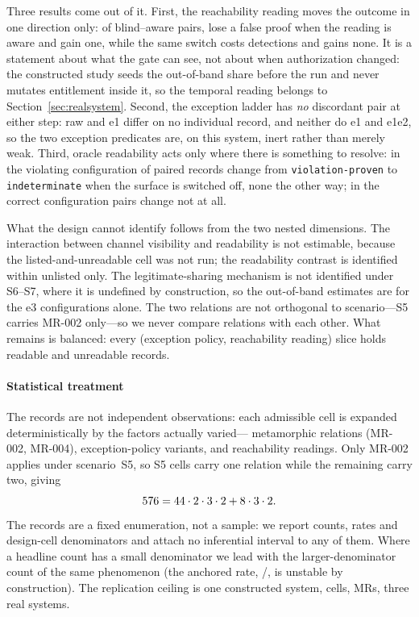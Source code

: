 Three results come out of it. First, the reachability reading moves the outcome in
one direction only: of \DsgGuiPairs{} blind--aware pairs, \DsgGuiFixedFP{} lose a
false proof when the reading is aware and \DsgGuiNewFP{} gain one, while the same
switch costs \DsgGuiLostTP{} detections and gains none. It is a statement about what
the gate can see, not about when authorization changed: the constructed study seeds
the out-of-band share before the run and never mutates entitlement inside it, so the
temporal reading belongs to Section~\ref{sec:realsystem}. Second, the exception
ladder has \emph{no} discordant pair at either step: raw and e1 differ on no
individual record, and neither do e1 and e1e2, so the two exception predicates are,
on this system, inert rather than merely weak. Third, oracle readability acts only
where there is something to resolve: in the violating configuration
\DsgReadGained{} of \DsgReadPairs{} paired records change from
\texttt{violation-proven} to \texttt{indeterminate} when the surface is switched
off, none the other way; in the correct configuration \DsgReadNullPairs{} pairs
change not at all.

What the design cannot identify follows from the two nested dimensions. The
interaction between channel visibility and readability is not estimable, because the
listed-and-unreadable cell was not run; the readability contrast is identified
within unlisted only. The legitimate-sharing mechanism is not identified under
S6--S7, where it is undefined by construction, so the out-of-band estimates are for
the e3 configurations alone. The two relations are not orthogonal to
scenario---S5 carries MR-002 only---so we never compare relations with each other.
What remains is balanced: every (exception policy, reachability reading) slice holds
\DsgBalOn{} readable and \DsgBalOff{} unreadable records.

\paragraph{Statistical treatment}
The \ResSynRecords{} records are not independent observations: each admissible cell is
expanded deterministically by the factors actually varied---\ResDesignMrs{} metamorphic
relations (MR-002, MR-004), \ResDesignPrecondVariants{} exception-policy variants, and
\ResDesignGuiModes{} reachability readings. Only MR-002 applies under scenario~S5, so
\ResDesignCellsOneMr{} S5 cells carry one relation while the remaining
\ResDesignCellsTwoMr{} carry two, giving
\[
576{} = 44{}\cdot2{}\cdot3{}\cdot2{}
+ 8{}\cdot3{}\cdot2{}.
\]
The records are a fixed enumeration, not a sample: we report counts, rates and
design-cell denominators and attach no inferential interval to any of them. Where a
headline count has a small denominator we lead with the larger-denominator count of the same
phenomenon (the anchored rate, \ResFpEthreeHits{}/\ResFpEthreeTotal{}, is unstable by
construction). The replication ceiling is one constructed system, \ResDesignCells{} cells,
\ResDesignMrs{} MRs, three real systems.
